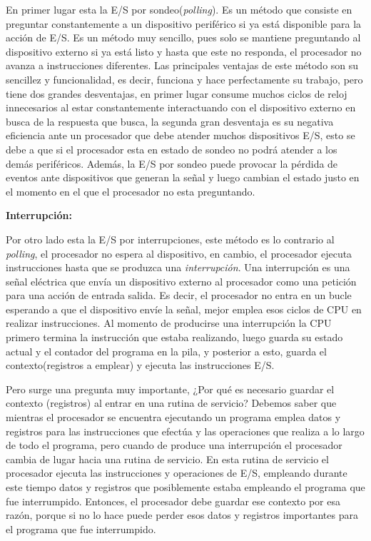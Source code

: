 \documentclass[12pt, a4paper]{article}
\begin{document}
En primer lugar esta la E/S por sondeo(\textit{polling}). Es un método que consiste en preguntar constantemente a un dispositivo periférico si ya está disponible para la acción de E/S. Es un método muy sencillo, pues solo se mantiene preguntando al dispositivo externo si ya está listo y hasta que este no responda, el procesador no avanza a instrucciones diferentes. Las principales ventajas de este método son su sencillez y funcionalidad, es decir, funciona y hace perfectamente su trabajo, pero tiene dos grandes desventajas, en primer lugar consume muchos ciclos de reloj innecesarios al estar constantemente interactuando con el dispositivo externo en busca de la respuesta que busca, la segunda gran desventaja es su negativa eficiencia ante un procesador que debe atender muchos dispositivos E/S, esto se debe a que si el procesador esta en estado de sondeo no podrá atender a los demás periféricos. Además, la E/S por sondeo puede provocar la pérdida de eventos ante dispositivos que generan la señal y luego cambian el estado justo en el momento en el que el procesador no esta preguntando.

\textbf{Interrupción:}

Por otro lado esta la E/S por interrupciones, este método es lo contrario al \textit{polling}, el procesador no espera al dispositivo, en cambio, el procesador ejecuta instrucciones hasta que se produzca una \textit{interrupción}. Una interrupción es una señal eléctrica que envía un dispositivo externo al procesador como una petición para una acción de entrada salida. Es decir, el procesador no entra en un bucle esperando a que el dispositivo envíe la señal, mejor emplea esos ciclos de CPU en realizar instrucciones. Al momento de producirse una interrupción la CPU primero termina la instrucción que estaba realizando, luego guarda su estado actual y el contador del programa en la pila, y posterior a esto, guarda el contexto(registros a emplear) y ejecuta las instrucciones E/S.

Pero surge una pregunta muy importante, ¿Por qué es necesario guardar el contexto (registros) al entrar en una rutina de servicio? Debemos saber que mientras el procesador se encuentra ejecutando un programa emplea datos y registros para las instrucciones que efectúa y las operaciones que realiza a lo largo de todo el programa, pero cuando de produce una interrupción el procesador cambia de lugar hacia una rutina de servicio. En esta rutina de servicio el procesador ejecuta las instrucciones y operaciones de E/S, empleando durante este tiempo datos y registros que posiblemente estaba empleando el programa que fue interrumpido. Entonces, el procesador debe guardar ese contexto por esa razón, porque si no lo hace puede perder esos datos y registros importantes para el programa que fue interrumpido.
\end{document}
